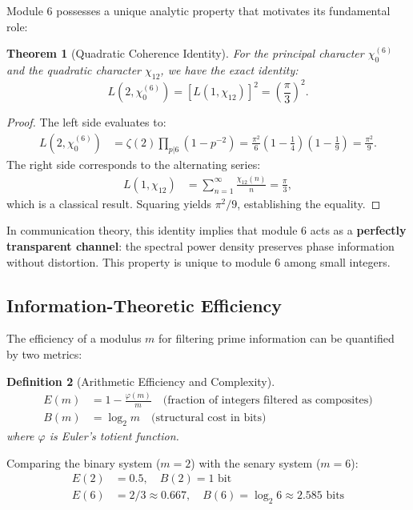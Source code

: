 \documentclass[prl,aps,floatfix,superscriptaddress,10pt]{revtex4-2}
\newtheorem{theorem}{Theorem}[section]
\newtheorem{definition}[theorem]{Definition}
\begin{document}
Module 6 possesses a unique analytic property that motivates its fundamental role:

\begin{theorem}[Quadratic Coherence Identity]
\label{thm:quadratic}
For the principal character $\chi_0^{(6)}$ and the quadratic character $\chi_{12}$, we have the exact identity:
\begin{equation}
L(2, \chi_0^{(6)}) = \left[ L(1, \chi_{12}) \right]^2 = \left( \frac{\pi}{3} \right)^2.
\end{equation}
\end{theorem}

\begin{proof}
The left side evaluates to:
\begin{align*}
L(2, \chi_0^{(6)}) &= \zeta(2) \prod_{p|6} (1-p^{-2}) = \frac{\pi^2}{6} \left(1-\frac{1}{4}\right)\left(1-\frac{1}{9}\right) = \frac{\pi^2}{9}.
\end{align*}
The right side corresponds to the alternating series:
\begin{align*}
L(1, \chi_{12}) &= \sum_{n=1}^\infty \frac{\chi_{12}(n)}{n} = \frac{\pi}{3},
\end{align*}
which is a classical result.
Squaring yields $\pi^2/9$, establishing the equality.
\end{proof}

In communication theory, this identity implies that module 6 acts as a \textbf{perfectly transparent channel}: the spectral power density preserves phase information without distortion.
This property is unique to module 6 among small integers.

\subsection{Information-Theoretic Efficiency}

The efficiency of a modulus $m$ for filtering prime information can be quantified by two metrics:

\begin{definition}[Arithmetic Efficiency and Complexity]
\begin{align}
E(m) &= 1 - \frac{\varphi(m)}{m} \quad \text{(fraction of integers filtered as composites)}\\
B(m) &= \log_2 m \quad \text{(structural cost in bits)}
\end{align}
where $\varphi$ is Euler's totient function.
\end{definition}

Comparing the binary system ($m=2$) with the senary system ($m=6$):
\begin{align*}
E(2) &= 0.5, \quad B(2) = 1 \text{ bit}\\
E(6) &= 2/3 \approx 0.667, \quad B(6) = \log_2 6 \approx 2.585 \text{ bits}
\end{align*}
\end{document}
